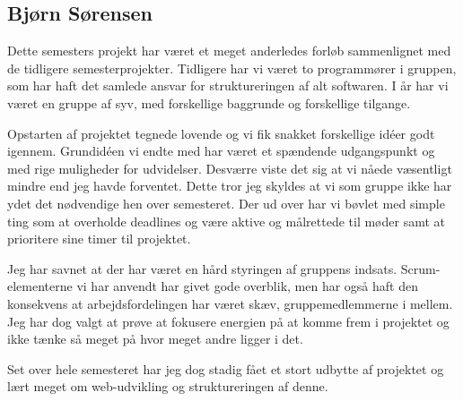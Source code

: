 \subsection*{Bjørn Sørensen}
Dette semesters projekt har været et meget anderledes forløb sammenlignet med de tidligere semesterprojekter. Tidligere har vi været to programmører i gruppen, som har haft det samlede ansvar for struktureringen af alt softwaren. I år har vi været en gruppe af syv, med forskellige baggrunde og forskellige tilgange.

Opstarten af projektet tegnede lovende og vi fik snakket forskellige idéer godt igennem. Grundidéen vi endte med har været et spændende udgangspunkt og med rige muligheder for udvidelser. Desværre viste det sig at vi nåede væsentligt mindre end jeg havde forventet. Dette tror jeg skyldes at vi som gruppe ikke har ydet det nødvendige hen over semesteret. Der ud over har vi bøvlet med simple ting som at overholde deadlines og være aktive og målrettede til møder samt at prioritere sine timer til projektet.

Jeg har savnet at der har været en hård styringen af gruppens indsats. Scrum-elementerne vi har anvendt har givet gode overblik, men har også haft den konsekvens at arbejdsfordelingen har været skæv, gruppemedlemmerne i mellem. Jeg har dog valgt at prøve at fokusere energien på at komme frem i projektet og ikke tænke så meget på hvor meget andre ligger i det.

Set over hele semesteret har jeg dog stadig fået et stort udbytte af projektet og lært meget om web-udvikling og struktureringen af denne.